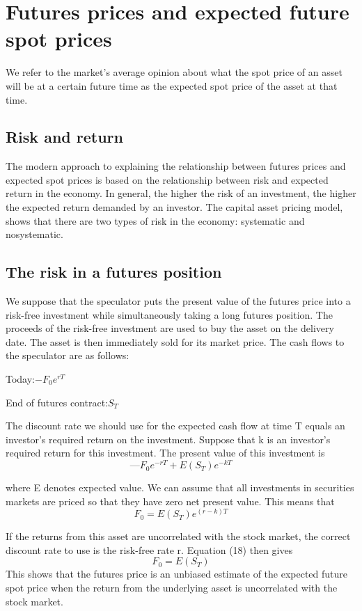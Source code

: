 \documentclass{article}
\begin{document}
\section{Futures prices and expected future spot prices}
We refer to the market's average opinion about what the spot price of an asset will be at a certain future time as the expected spot price of the asset at that time.

\subsection{Risk and return}
The modern approach to explaining the relationship between futures prices and expected spot prices is based on the relationship between risk and expected return in the economy.
In general, the higher the risk of an investment, the higher the expected return demanded by an investor. The capital asset pricing model, shows that there are two types of risk in the economy: systematic and nosystematic.

\subsection{The risk in a futures position}
We suppose that the speculator puts the present value of the futures price into a risk-free investment while simultaneously taking a long futures position. The proceeds of the risk-free investment are used to buy the asset on the delivery date. The asset is then immediately sold for its market price. The cash flows to the speculator are as follows:

Today:$ -F_0e^{rT} $

End of futures contract:$ S_T $

The discount rate we should use for the expected cash flow at time T equals an investor's required return on the investment. Suppose that k is an investor's required return for this investment. The present value of this investment is 
\[
—F_0e^{-rT}+E(S_T)e^{-kT}
\]

where E denotes expected value. We can assume that all investments in securities markets are priced so that they have zero net present value. This means that
\begin{equation}
	F_0=E(S_T)e^{(r-k)T}
\end{equation}

If the returns from this asset are uncorrelated with the stock market, the correct discount rate to use is the risk-free rate r. Equation (18) then gives
\[
F_0=E(S_T)
\]
This shows that the futures price is an unbiased estimate of the expected future spot price when the return from the underlying asset is uncorrelated with the stock market.
\end{document}

